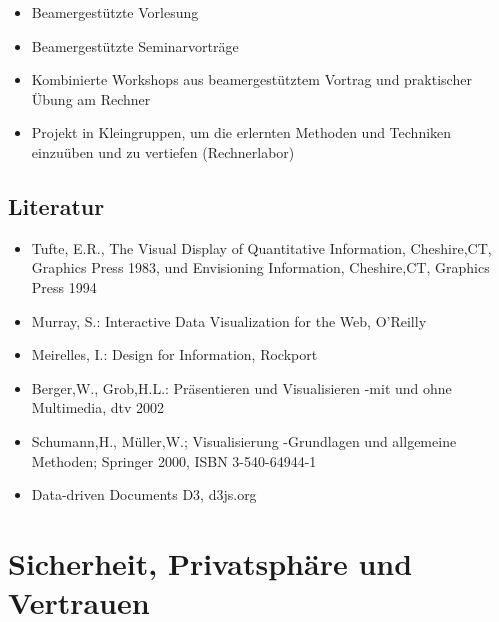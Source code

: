 \begin{itemize}
\tightlist
\item
  Beamergestützte Vorlesung
\item
  Beamergestützte Seminarvorträge
\item
  Kombinierte Workshops aus beamergestütztem Vortrag und praktischer
  Übung am Rechner
\item
  Projekt in Kleingruppen, um die erlernten Methoden und Techniken
  einzuüben und zu vertiefen (Rechnerlabor)
\end{itemize}

\section*{Literatur\label{/mi-2017/modulbeschreibungen-master/MA_VC_Modul_Visualisierung}}\label{literaturpathlabelmi-2017modulbeschreibungen-mastermaux5fvcux5fmodulux5fvisualisierung}

\begin{itemize}
\tightlist
\item
  Tufte, E.R., The Visual Display of Quantitative Information,
  Cheshire,CT, Graphics Press 1983, und Envisioning Information,
  Cheshire,CT, Graphics Press 1994
\item
  Murray, S.: Interactive Data Visualization for the Web, O'Reilly
\item
  Meirelles, I.: Design for Information, Rockport
\item
  Berger,W., Grob,H.L.: Präsentieren und Visualisieren -mit und ohne
  Multimedia, dtv 2002
\item
  Schumann,H., Müller,W.; Visualisierung -Grundlagen und allgemeine
  Methoden; Springer 2000, ISBN 3-540-64944-1
\item
  Data-driven Documents D3, d3js.org
\end{itemize}

\chapter{Sicherheit, Privatsphäre und
Vertrauen\label{/mi-2017/modulbeschreibungen-master/MA_WTW_Modul_IT-Sicherheit}}\label{sicherheit-privatsphuxe4re-und-vertrauenpathlabelmi-2017modulbeschreibungen-mastermaux5fwtwux5fmodulux5fit-sicherheit}

